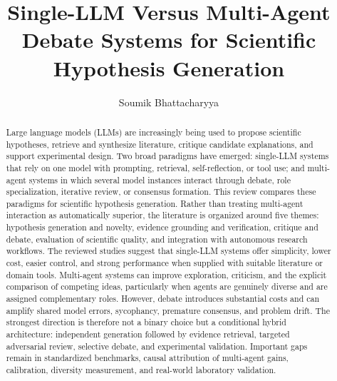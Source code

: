 \documentclass[acmsmall,screen,review]{acmart}
\title[Single-LLM Versus Multi-Agent Debate Systems]
  {Single-LLM Versus Multi-Agent Debate Systems for Scientific Hypothesis Generation}
\author{Soumik Bhattacharyya}
\affiliation{%
  \department{Department of Information Technology}
  \institution{Indian Institute of Information Technology Allahabad}
  \city{Prayagraj}
  \state{Uttar Pradesh}
  \country{India}
}
\begin{document}
\begin{abstract}
Large language models (LLMs) are increasingly being used to propose scientific hypotheses,
retrieve and synthesize literature, critique candidate explanations, and support experimental design.
Two broad paradigms have emerged: single-LLM systems that rely on one model with prompting,
retrieval, self-reflection, or tool use; and multi-agent systems in which several model instances
interact through debate, role specialization, iterative review, or consensus formation. This review
compares these paradigms for scientific hypothesis generation. Rather than treating multi-agent
interaction as automatically superior, the literature is organized around five themes: hypothesis
generation and novelty, evidence grounding and verification, critique and debate, evaluation of
scientific quality, and integration with autonomous research workflows. The reviewed studies
suggest that single-LLM systems offer simplicity, lower cost, easier control, and strong
performance when supplied with suitable literature or domain tools. Multi-agent systems can
improve exploration, criticism, and the explicit comparison of competing ideas, particularly when
agents are genuinely diverse and are assigned complementary roles. However, debate introduces
substantial costs and can amplify shared model errors, sycophancy, premature consensus, and
problem drift. The strongest direction is therefore not a binary choice but a conditional hybrid
architecture: independent generation followed by evidence retrieval, targeted adversarial review,
selective debate, and experimental validation. Important gaps remain in standardized benchmarks,
causal attribution of multi-agent gains, calibration, diversity measurement, and real-world
laboratory validation.
\end{abstract}



\maketitle

\let\ACMSection\section
\let\ACMBibliography
\let\ACMBibliographyStyle
\end{document}
